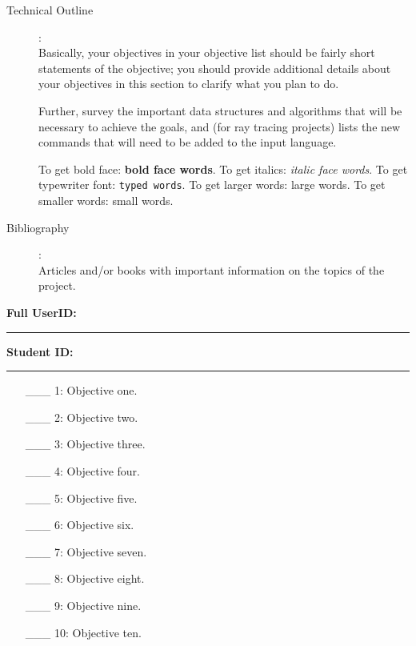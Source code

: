 \documentclass {article}
\begin{document}
\begin{description}
\item[Technical Outline]:\\
Basically, your objectives in your objective list should be fairly
short statements of the objective; you should provide additional
details about your objectives in this section to clarify what you
plan to do.

Further, survey the important data structures and algorithms that
will be necessary to achieve the goals, and (for ray tracing
projects) lists the new commands
that will need to be added to the input language.

To  get  bold face: {\bf bold face words}.  To get italics: {\it italic
face words}.  To  get typewriter font: {\tt typed words}.  To get
larger  words:  {\large large  words}.   To  get smaller words: 
{\small small words}.  

\item[Bibliography]:\\
Articles  and/or  books  with  important  information on the
topics of the project.

\end{description}
\newpage



{\hfill{\bf Full UserID:\rule{2in}{.1mm}}\hfill{\bf Student ID:\rule{2in}{.1mm}}\hfill}

\begin{enumerate}
\item[\_\_\_ 1:]  Objective one.

\item[\_\_\_ 2:]  Objective two.

\item[\_\_\_ 3:]  Objective three.

\item[\_\_\_ 4:]  Objective four.

\item[\_\_\_ 5:]  Objective five.

\item[\_\_\_ 6:]  Objective six.

\item[\_\_\_ 7:]  Objective seven.

\item[\_\_\_ 8:]  Objective eight.

\item[\_\_\_ 9:]  Objective nine.

\item[\_\_\_ 10:]  Objective ten.
\end{enumerate}

\end{document}
